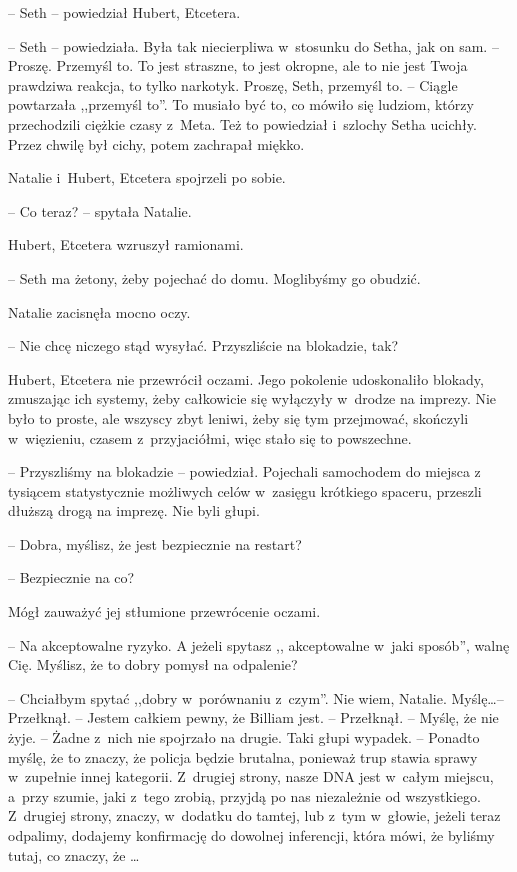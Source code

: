 \documentclass[oneside,polish,11pt,sfheadings]{mwbk}
\begin{document}
-- Seth -- powiedział Hubert, Etcetera.

-- Seth -- powiedziała. Była tak niecierpliwa w~stosunku do Setha, jak on
sam. -- Proszę. Przemyśl to. To jest straszne, to jest okropne, ale to
nie jest Twoja prawdziwa reakcja, to tylko narkotyk. Proszę, Seth,
przemyśl to. -- Ciągle powtarzała ,,przemyśl to''. To musiało być to, co
mówiło się ludziom, którzy przechodzili ciężkie czasy z~Meta. Też to
powiedział i~szlochy Setha ucichły. Przez chwilę był cichy, potem
zachrapał miękko.

Natalie i~Hubert, Etcetera spojrzeli po sobie. 

-- Co teraz? -- spytała
Natalie.

Hubert, Etcetera wzruszył ramionami. 

-- Seth ma żetony, żeby pojechać do
domu. Moglibyśmy go obudzić.

Natalie zacisnęła mocno oczy. 

-- Nie chcę niczego stąd wysyłać.
Przyszliście na blokadzie, tak?

Hubert, Etcetera nie przewrócił oczami. Jego pokolenie udoskonaliło
blokady, zmuszając ich systemy, żeby całkowicie się wyłączyły w~drodze
na imprezy. Nie było to proste, ale wszyscy zbyt leniwi, żeby się tym
przejmować, skończyli w~więzieniu, czasem z~przyjaciółmi, więc stało się
to powszechne.

-- Przyszliśmy na blokadzie -- powiedział. Pojechali samochodem do miejsca
z tysiącem statystycznie możliwych celów w~zasięgu krótkiego spaceru,
przeszli dłuższą drogą na imprezę. Nie byli głupi.

-- Dobra, myślisz, że jest bezpiecznie na restart?

-- Bezpiecznie na co?

Mógł zauważyć jej stłumione przewrócenie oczami. 

-- Na akceptowalne
ryzyko. A jeżeli spytasz ,, akceptowalne w~jaki sposób'', walnę Cię.
Myślisz, że to dobry pomysł na odpalenie?

-- Chciałbym spytać ,,dobry w~porównaniu z~czym''. Nie wiem, Natalie.
Myślę\ldots  -- Przełknął. -- Jestem całkiem pewny, że Billiam jest. -- Przełknął. -- Myślę, że nie żyje. -- Żadne z~nich nie spojrzało na drugie.
Taki głupi wypadek. -- Ponadto myślę, że to znaczy, że policja będzie
brutalna, ponieważ trup stawia sprawy w~zupełnie innej kategorii. Z~drugiej strony, nasze DNA jest w~całym miejscu, a~przy szumie, jaki z~tego zrobią, przyjdą po nas niezależnie od wszystkiego. Z~drugiej
strony, znaczy, w~dodatku do tamtej, lub z~tym w~głowie, jeżeli teraz
odpalimy, dodajemy konfirmację do dowolnej inferencji, która mówi, że
byliśmy tutaj, co znaczy, że \ldots 
\end{document}

